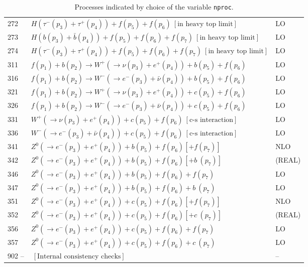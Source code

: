 \documentclass[12pt]{article}
\begin{document}
\begin{itemize}
\begin{table}
\begin{center}
\begin{tabular}{|l|l|l|}
272& $ H(\tau^-(p_3)+\tau^+(p_4))+f(p_5)+f(p_6)~[ \mbox{in heavy top limit} ] $ & LO \\
273& $ H(b(p_3)+\bar{b}(p_4))+f(p_5)+f(p_6)+f(p_7)~[ \mbox{in heavy top limit} ] $ & LO \\
274& $ H(\tau^-(p_3)+\tau^+(p_4))+f(p_5)+f(p_6)+f(p_7)~[ \mbox{in heavy top limit} ] $ & LO \\
\hline 
311& $  f(p_1)+b(p_2) \to  W^+(\to \nu(p_3)+e^+(p_4))+b(p_5)+f(p_6) $ & LO \\
316& $  f(p_1)+b(p_2) \to  W^-(\to e^-(p_3)+\bar{\nu}(p_4))+b(p_5)+f(p_6) $ & LO \\
\hline 
321& $  f(p_1)+b(p_2) \to  W^+(\to \nu(p_3)+e^+(p_4))+c(p_5)+f(p_6) $ & LO \\
326& $  f(p_1)+b(p_2) \to  W^-(\to e^-(p_3)+\bar{\nu}(p_4))+c(p_5)+f(p_6) $ & LO \\
\hline 
331& $ W^+(\to \nu(p_3)+e^+(p_4))+c(p_5)+f(p_6) ~[ \mbox{c-s interaction} ] $ & LO \\
336& $ W^-(\to e^-(p_3)+\bar{\nu}(p_4))+c(p_5)+f(p_6) ~[ \mbox{c-s interaction} ] $ & LO \\
\hline 
341& $ Z^0(\to e^-(p_3)+e^+(p_4))+b(p_5)+f(p_6) [+f(p_7)]$ & NLO \\
342& $ Z^0(\to e^-(p_3)+e^+(p_4))+b(p_5)+f(p_6) [+b~(p_7)]$ & (REAL) \\
346& $ Z^0(\to e^-(p_3)+e^+(p_4))+b(p_5)+f(p_6)+f(p_7)$ & LO \\
347& $ Z^0(\to e^-(p_3)+e^+(p_4))+b(p_5)+f(p_6)+b~(p_7)$ & LO \\
\hline 
351& $ Z^0(\to e^-(p_3)+e^+(p_4))+c(p_5)+f(p_6) [+f(p_7)]$ & NLO \\
352& $ Z^0(\to e^-(p_3)+e^+(p_4))+c(p_5)+f(p_6) [+c~(p_7)]$ & (REAL) \\
356& $ Z^0(\to e^-(p_3)+e^+(p_4))+c(p_5)+f(p_6)+f(p_7)$ & LO \\
357& $ Z^0(\to e^-(p_3)+e^+(p_4))+c(p_5)+f(p_6)+c~(p_7)$ & LO \\
\hline 
902 --& $  ~[ \mbox{Internal consistency checks} ] $ & -- \\
\hline
\end{tabular}
\end{center}
\caption{Processes indicated by choice of the variable {\tt nproc}.\label{nproctable}}


\end{table}
\end{itemize}
\end{document}
